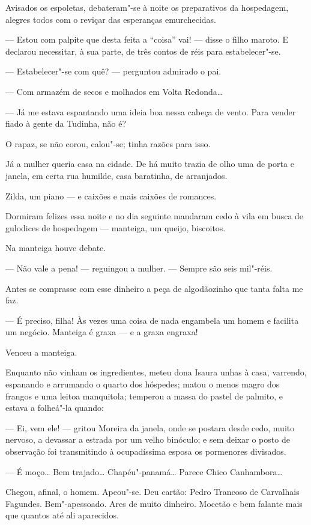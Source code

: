 Avisados os espoletas, debateram"-se à noite os preparativos da
hospedagem, alegres todos com o reviçar das esperanças emurchecidas.

--- Estou com palpite que desta feita a ``coisa'' vai! --- disse o filho
maroto. E declarou necessitar, à sua parte, de três contos de réis para
estabelecer"-se.

--- Estabelecer"-se com quê? --- perguntou admirado o pai.

--- Com armazém de secos e molhados em Volta Redonda\ldots{}

--- Já me estava espantando uma ideia boa nessa cabeça de vento. Para
vender fiado à gente da Tudinha, não é?

O rapaz, se não corou, calou"-se; tinha razões para isso.

Já a mulher queria casa na cidade. De há muito trazia de olho uma de
porta e janela, em certa rua humilde, casa baratinha, de arranjados.

Zilda, um piano --- e caixões e mais caixões de romances.

Dormiram felizes essa noite e no dia seguinte mandaram cedo à vila em
busca de gulodices de hospedagem --- manteiga, um queijo, biscoitos.

Na manteiga houve debate.

--- Não vale a pena! --- reguingou a mulher. --- Sempre são seis
mil"-réis.

Antes se comprasse com esse dinheiro a peça de algodãozinho que tanta
falta me faz.

--- É preciso, filha! Às vezes uma coisa de nada engambela um homem e
facilita um negócio. Manteiga é graxa --- e a graxa engraxa!

Venceu a manteiga.

Enquanto não vinham os ingredientes, meteu dona Isaura unhas à casa,
varrendo, espanando e arrumando o quarto dos hóspedes; matou o menos
magro dos frangos e uma leitoa manquitola; temperou a massa do pastel de
palmito, e estava a folheá"-la quando:

--- Ei, vem ele! --- gritou Moreira da janela, onde se postara desde
cedo, muito nervoso, a devassar a estrada por um velho binóculo; e sem
deixar o posto de observação foi transmitindo à ocupadíssima esposa os
pormenores divisados.

--- É moço\ldots{} Bem trajado\ldots{} Chapéu"-panamá\ldots{} Parece Chico Canhambora\ldots{}

Chegou, afinal, o homem. Apeou"-se. Deu cartão: Pedro Trancoso de
Carvalhais Fagundes. Bem"-apessoado. Ares de muito dinheiro. Mocetão e
bem falante mais que quantos até ali aparecidos.

